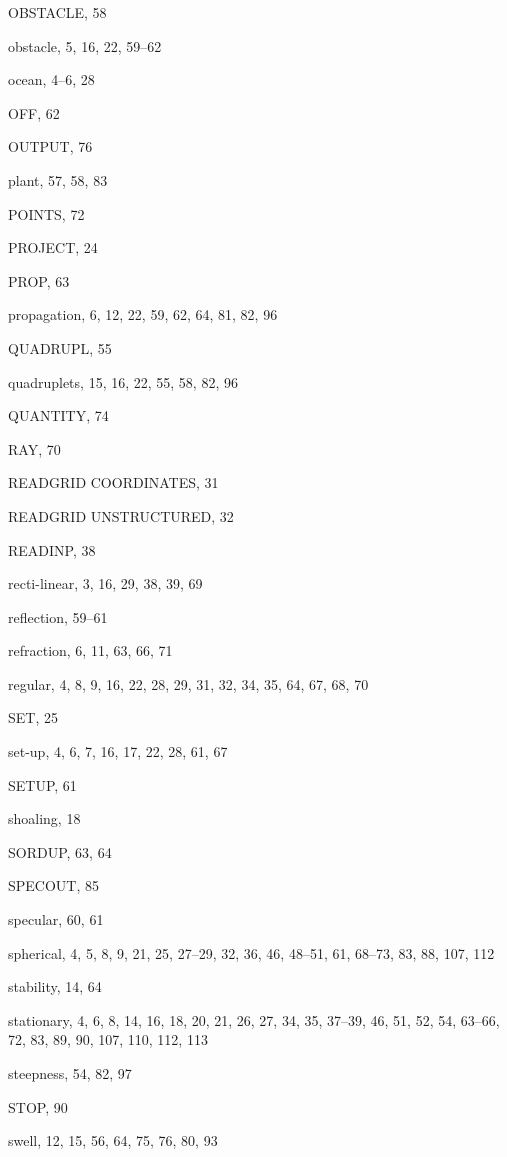 \documentclass[12pt]{book}
\begin{document}
\begin{theindex}
  \indexspace

  \item OBSTACLE, 58
  \item obstacle, 5, 16, 22, 59--62
  \item ocean, 4--6, 28
  \item OFF, 62
  \item OUTPUT, 76

  \indexspace

  \item plant, 57, 58, 83
  \item POINTS, 72
  \item PROJECT, 24
  \item PROP, 63
  \item propagation, 6, 12, 22, 59, 62, 64, 81, 82, 96

  \indexspace

  \item QUADRUPL, 55
  \item quadruplets, 15, 16, 22, 55, 58, 82, 96
  \item QUANTITY, 74

  \indexspace

  \item RAY, 70
  \item READGRID COORDINATES, 31
  \item READGRID UNSTRUCTURED, 32
  \item READINP, 38
  \item recti-linear, 3, 16, 29, 38, 39, 69
  \item reflection, 59--61
  \item refraction, 6, 11, 63, 66, 71
  \item regular, 4, 8, 9, 16, 22, 28, 29, 31, 32, 34, 35, 64, 67, 68,
		70

  \indexspace

  \item SET, 25
  \item set-up, 4, 6, 7, 16, 17, 22, 28, 61, 67
  \item SETUP, 61
  \item shoaling, 18
  \item SORDUP, 63, 64
  \item SPECOUT, 85
  \item specular, 60, 61
  \item spherical, 4, 5, 8, 9, 21, 25, 27--29, 32, 36, 46, 48--51, 61,
		68--73, 83, 88, 107, 112
  \item stability, 14, 64
  \item stationary, 4, 6, 8, 14, 16, 18, 20, 21, 26, 27, 34, 35, 37--39,
		46, 51, 52, 54, 63--66, 72, 83, 89, 90, 107, 110,
		112, 113
  \item steepness, 54, 82, 97
  \item STOP, 90
  \item swell, 12, 15, 56, 64, 75, 76, 80, 93


\end{theindex}
\end{document}
